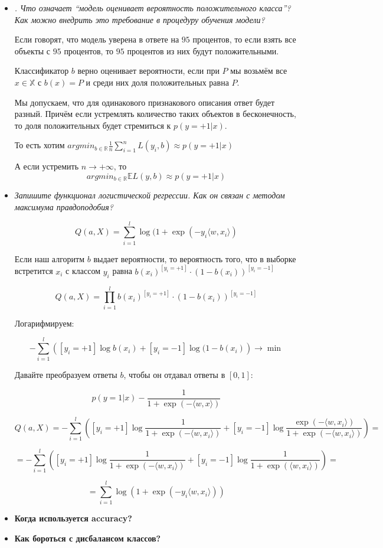 \documentclass[a4paper]{article}
\begin{document}
\begin{itemize}
\item \textit{. Что означает “модель оценивает вероятность положительного класса”? Как можно
внедрить это требование в процедуру обучения модели?}

Если говорят, что модель уверена в ответе на $95$ процентов, то если взять все объекты с $95$ процентов, то $95$ процентов из них будут положительными.

Классификатор $b$ верно оценивает вероятности, если при $P$ мы возьмём все $x \in \mathbb{X}$ с $b(x) = P$ и среди них доля положительных равна $P$.

Мы допускаем, что для одинакового признакового описания ответ будет разный. Причём если устремлять количество таких объектов в бесконечность, то доля положительных будет стремиться к $p(y=+1|x)$.

То есть хотим $argmin_{b \in \mathbb{R}} \frac{1}{n} \sum_{i=1}^n L(y_i, b) \approx p(y=+1|x)$

А если устремить $n \rightarrow +\infty$, то 
\[ argmin_{b \in \mathbb{R}} \mathbb{E} L(y, b) \approx p(y=+1|x) \]

\item \textit{Запишите функционал логистической регрессии. Как он связан с методом максимума
правдоподобия?}

\[ Q(a, X) =  \sum_{i=1}^l \log (1+\exp(-y_i \langle w, x_i \rangle )\]

Если наш алгоритм $b$ выдает вероятности, то вероятность того, что в выборке встретится $x_i$ с классом $y_i$ равна $b(x_i)^{[y_i = +1]}\cdot (1-b(x_i))^{[y_i=-1]}$

\[ Q(a, X) = \prod_{i=1}^l b(x_i)^{[y_i = +1]}\cdot (1-b(x_i))^{[y_i=-1]} \]

Логарифмируем:

\[ - \sum_{i=1}^l \left( [y_i = +1] \log b(x_i) + [y_i = -1] \log (1-b(x_i) \right) \rightarrow \min \]

Давайте преобразуем ответы $b$, чтобы он отдавал ответы в $[0,1]$:

\[ p(y=1|x) - \frac{1}{1+\exp(-\langle w, x \rangle)} \]

\[ Q(a, X) = - \sum_{i=1}^l \left( [y_i = +1] \log \frac{1}{1+\exp(-\langle w, x_i \rangle)} + [y_i = -1] \log \frac{\exp(-\langle w, x_i \rangle)}{1 + \exp(-\langle w, x_i \rangle)} \right) = \]

\[
= - \sum_{i=1}^l \left( [y_i = +1] \log \frac{1}{1+\exp(-\langle w, x_i \rangle)} + [y_i = -1] \log \frac{1}{1 + \exp(\langle w, x_i \rangle)} \right) = 
\]

\[ = \sum_{i=1}^l \log \left( 1+\exp(-y_i \langle w, x_i \rangle) \right) \]

\item \textbf{Когда используется accuracy?}

\item \textbf{Как бороться с дисбалансом классов?}


\end{itemize}
\end{document}
